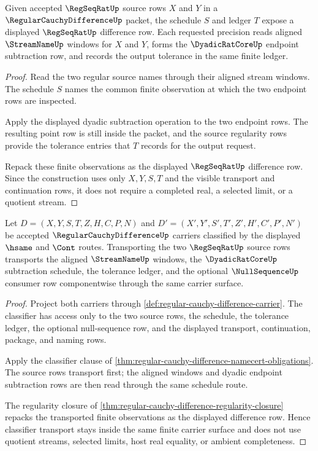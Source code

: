 \begin{theorem}
\label{thm:regular-cauchy-difference-regularity-closure}
Given accepted $\RegSeqRatUp$ source rows $X$ and $Y$ in a $\RegularCauchyDifferenceUp$ packet, the schedule $S$ and ledger $T$ expose a displayed $\RegSeqRatUp$ difference row. Each requested precision reads aligned $\StreamNameUp$ windows for $X$ and $Y$, forms the $\DyadicRatCoreUp$ endpoint subtraction row, and records the output tolerance in the same finite ledger.
\end{theorem}
\begin{proof}
Read the two regular source names through their aligned stream windows. The schedule $S$ names the common finite observation at which the two endpoint rows are inspected.

Apply the displayed dyadic subtraction operation to the two endpoint rows. The resulting point row is still inside the packet, and the source regularity rows provide the tolerance entries that $T$ records for the output request.

Repack these finite observations as the displayed $\RegSeqRatUp$ difference row. Since the construction uses only $X,Y,S,T$ and the visible transport and continuation rows, it does not require a completed real, a selected limit, or a quotient stream.
\end{proof}

\begin{theorem}
\label{thm:regular-cauchy-difference-classifier-transport}
Let $D=(X,Y,S,T,Z,H,C,P,N)$ and $D'=(X',Y',S',T',Z',H',C',P',N')$ be accepted $\RegularCauchyDifferenceUp$ carriers classified by the displayed $\hsame$ and $\Cont$ routes. Transporting the two $\RegSeqRatUp$ source rows transports the aligned $\StreamNameUp$ windows, the $\DyadicRatCoreUp$ subtraction schedule, the tolerance ledger, and the optional $\NullSequenceUp$ consumer row componentwise through the same carrier surface.
\end{theorem}
\begin{proof}
Project both carriers through \autoref{def:regular-cauchy-difference-carrier}. The classifier has access only to the two source rows, the schedule, the tolerance ledger, the optional null-sequence row, and the displayed transport, continuation, package, and naming rows.

Apply the classifier clause of \autoref{thm:regular-cauchy-difference-namecert-obligations}. The source rows transport first; the aligned windows and dyadic endpoint subtraction rows are then read through the same schedule route.

The regularity closure of \autoref{thm:regular-cauchy-difference-regularity-closure} repacks the transported finite observations as the displayed difference row. Hence classifier transport stays inside the same finite carrier surface and does not use quotient streams, selected limits, host real equality, or ambient completeness.
\end{proof}

